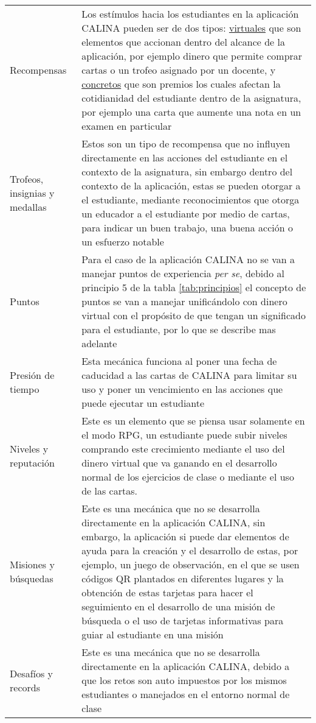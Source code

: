 \begin{longtable}{ p{50mm} p{100mm} }
Recompensas
&
Los estímulos hacia los estudiantes en la aplicación CALINA pueden ser de dos tipos: \uline{virtuales} que son 
elementos que accionan dentro del alcance de la aplicación, por ejemplo dinero que permite comprar cartas o un 
trofeo asignado por un docente, y \uline{concretos} que son premios los cuales afectan la cotidianidad del 
estudiante dentro de la asignatura, por ejemplo una carta que aumente una nota en un examen en particular
\\
Trofeos, insignias y medallas
&
Estos son un tipo de recompensa que no influyen directamente en las acciones del estudiante en el contexto de 
la asignatura, sin embargo dentro del contexto de la aplicación, estas se pueden otorgar a el estudiante, 
mediante reconocimientos que otorga un educador a el estudiante por medio de cartas, para indicar un buen 
trabajo, una buena acción o un esfuerzo notable
\\
Puntos
&
Para el caso de la aplicación CALINA no se van a manejar puntos de experiencia \textit{per se}, debido al 
principio 5 de la tabla \ref{tab:principios} el concepto de puntos se van a manejar unificándolo con dinero 
virtual con el propósito de que tengan un significado para el estudiante, por lo que se describe mas adelante
\\
Presión de tiempo
& 
Esta mecánica funciona al poner una fecha de caducidad a las cartas de CALINA para limitar su uso y poner un
vencimiento en las acciones que puede ejecutar un estudiante
\\
Niveles y reputación
&
Este es un elemento que se piensa usar solamente en el modo RPG, un estudiante puede subir niveles comprando 
este crecimiento mediante el uso del dinero virtual que va ganando en el desarrollo normal de los 
ejercicios de clase o mediante el uso de las cartas.
\\
Misiones y búsquedas
&
Este es una mecánica que no se desarrolla directamente en la aplicación CALINA, sin embargo, la aplicación
si puede dar elementos de ayuda para la creación y el desarrollo de estas, por ejemplo, un juego de 
observación, en el que se usen códigos QR plantados en diferentes lugares y la obtención de estas tarjetas 
para hacer el seguimiento en el desarrollo de una misión de búsqueda o el uso de tarjetas informativas para 
guiar al estudiante en una misión
\\
Desafíos y records
& 
Este es una mecánica que no se desarrolla directamente en la aplicación CALINA, debido a que los retos son 
auto impuestos por los mismos estudiantes o manejados en el entorno normal de clase

\end{longtable}
